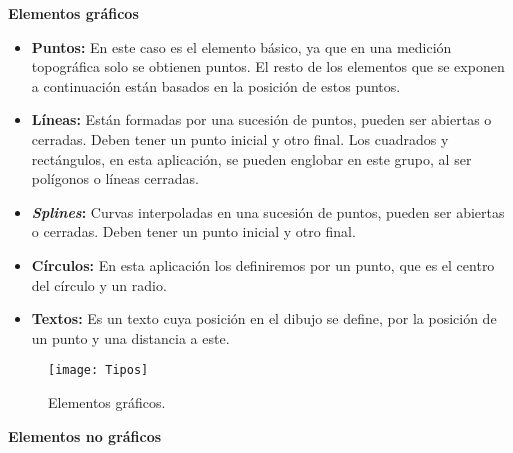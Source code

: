\textbf {Elementos gráficos}
\begin{itemize}
\item\textbf{Puntos:} En este caso es el elemento básico, ya que en una medición topográfica solo se obtienen puntos. El resto de los elementos que se exponen a continuación están basados en la posición de estos puntos.

\item\textbf{Líneas:} Están formadas por una sucesión de puntos, pueden ser abiertas o cerradas. Deben tener un punto inicial y otro final. Los cuadrados y rectángulos, en esta aplicación, se pueden englobar en este grupo, al ser polígonos o líneas cerradas.

\item\textbf{\emph{Splines}:} Curvas interpoladas en una sucesión de puntos, pueden ser abiertas o cerradas. Deben tener un punto inicial y otro final.

\item\textbf{Círculos:} En esta aplicación los definiremos por un punto, que es el centro del círculo y un radio.

\item\textbf{Textos:} Es un texto cuya posición en el dibujo se define, por la posición de un punto y una distancia a este.

\end{itemize}


\begin{figure}[!h]
	\centering
	\texttt{[image: Tipos]}
	\caption{Elementos gráficos.}
	\label{fig:Tipos}
\end{figure}

\newpage

\textbf {Elementos no gráficos}

